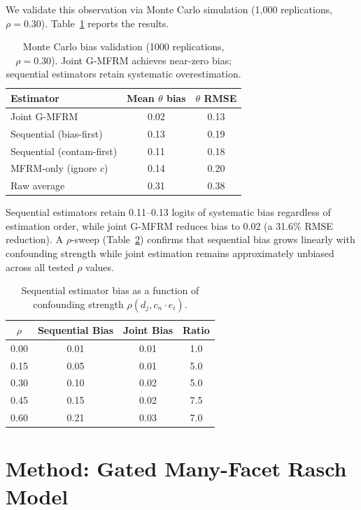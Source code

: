 \documentclass[letterpaper,11pt]{article}
\begin{document}
We validate this observation via Monte Carlo simulation (1,000 replications, $\rho = 0.30$). Table~\ref{tab:mc_bias} reports the results.

\begin{table}[t]
\centering
\caption{Monte Carlo bias validation (1000 replications, $\rho = 0.30$). Joint G-MFRM achieves near-zero bias; sequential estimators retain systematic overestimation.}
\label{tab:mc_bias}
\small
\begin{tabular}{lcc}
\toprule
Estimator & Mean $\theta$ bias & $\theta$ RMSE \\
\midrule
Joint G-MFRM & 0.02 & 0.13 \\
Sequential (bias-first) & 0.13 & 0.19 \\
Sequential (contam-first) & 0.11 & 0.18 \\
MFRM-only (ignore $c$) & 0.14 & 0.20 \\
Raw average & 0.31 & 0.38 \\
\bottomrule
\end{tabular}
\end{table}

Sequential estimators retain 0.11--0.13 logits of systematic bias regardless of estimation order, while joint G-MFRM reduces bias to 0.02 (a 31.6\% RMSE reduction). A $\rho$-sweep (Table~\ref{tab:rho_sweep}) confirms that sequential bias grows linearly with confounding strength while joint estimation remains approximately unbiased across all tested $\rho$ values.

\begin{table}[t]
\centering
\caption{Sequential estimator bias as a function of confounding strength $\rho(d_j, c_n \cdot e_i)$.}
\label{tab:rho_sweep}
\small
\begin{tabular}{cccc}
\toprule
$\rho$ & Sequential Bias & Joint Bias & Ratio \\
\midrule
0.00 & 0.01 & 0.01 & 1.0 \\
0.15 & 0.05 & 0.01 & 5.0 \\
0.30 & 0.10 & 0.02 & 5.0 \\
0.45 & 0.15 & 0.02 & 7.5 \\
0.60 & 0.21 & 0.03 & 7.0 \\
\bottomrule
\end{tabular}
\end{table}

\section{Method: Gated Many-Facet Rasch Model}
\label{sec:method}
\end{document}
